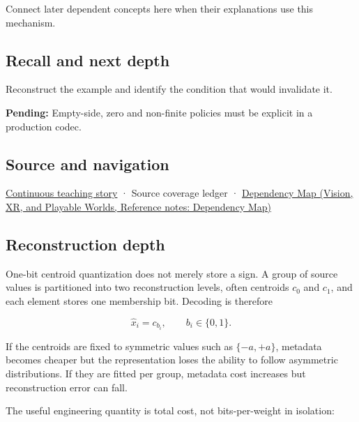 Connect later dependent concepts here when their explanations use this mechanism.

\subsection{Recall and next depth}\label{appendix-4ccd7a775813-recall-and-next-depth}

\hypertarget{appendix-4ccd7a775813-recall-and-next-depth}{}

Reconstruct the example and identify the condition that would invalidate it.

\textbf{Pending:} Empty-side, zero and non-finite policies must be explicit in a production codec.

\subsection{Source and navigation}\label{appendix-4ccd7a775813-source-and-navigation}

\hypertarget{appendix-4ccd7a775813-source-and-navigation}{}

\hyperref[01-foundations-i-ch001-choosing-what-information-to-keep]{Continuous teaching story} · {Source coverage ledger} · \href{../07-Vision-XR-and-Playable-Worlds/main.pdf\#nameddest=appendix-4ad47bdd269a}{Dependency Map (Vision, XR, and Playable Worlds, Reference notes: Dependency Map)}

\subsection{Reconstruction depth}\label{appendix-4ccd7a775813-reconstruction-depth}

\hypertarget{appendix-4ccd7a775813-reconstruction-depth}{}

One-bit centroid quantization does not merely store a sign. A group of source values is partitioned into two reconstruction levels, often centroids \(c_0\) and \(c_1\), and each element stores one membership bit. Decoding is therefore

\[
\hat x_i = c_{b_i},
\qquad b_i\in\{0,1\}.
\]

If the centroids are fixed to symmetric values such as \(\{-a,+a\}\), metadata becomes cheaper but the representation loses the ability to follow asymmetric distributions. If they are fitted per group, metadata cost increases but reconstruction error can fall.

The useful engineering quantity is total cost, not bits-per-weight in isolation:

